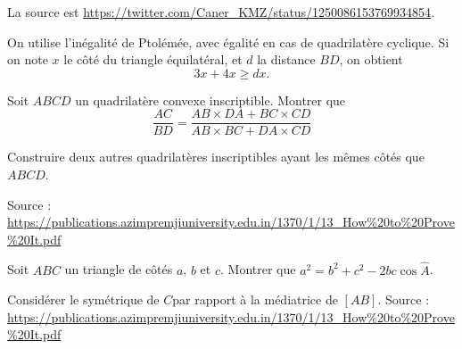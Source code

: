 \begin{exo}
\begin{center}
\end{center}
\begin{sol}
La source est \url{https://twitter.com/Caner_KMZ/status/1250086153769934854}.

On utilise l'inégalité de Ptolémée, avec égalité en cas de quadrilatère cyclique. Si on note $x$ le côté du triangle équilatéral, et $d$ la distance $BD$, on obtient 
\[ 3x+4x\geq dx.\]
\end{sol}
\end{exo}


\begin{exo}
Soit $ABCD$ un quadrilatère convexe inscriptible.
Montrer que
\[ \frac{AC}{BD} = \frac{AB\times DA + BC\times CD}{AB\times BC + DA\times CD}\]
\begin{hint}
Construire deux autres quadrilatères inscriptibles ayant les mêmes côtés que $ABCD$.
\end{hint}
\begin{sol}
Source : \url{https://publications.azimpremjiuniversity.edu.in/1370/1/13_How%20to%20Prove%20It.pdf}

\end{sol}
\end{exo}


\begin{exo}
Soit $ABC$ un triangle de côtés $a$, $b$ et $c$.
Montrer que $a^2=b^2+c^2-2bc\cos\widehat A$.
\begin{hint}
Considérer le symétrique de $C$par rapport à la médiatrice de $[AB]$.
Source : \url{https://publications.azimpremjiuniversity.edu.in/1370/1/13_How%20to%20Prove%20It.pdf}
\end{hint}
\end{exo}


